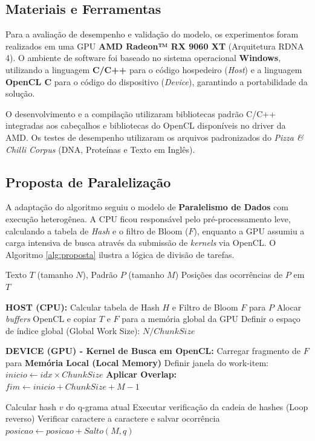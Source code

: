 \documentclass[12pt]{article}
\begin{document}
\subsection{Materiais e Ferramentas}

Para a avaliação de desempenho e validação do modelo, os experimentos foram realizados em uma GPU \textbf{AMD Radeon™ RX 9060 XT} (Arquitetura RDNA 4). O ambiente de software foi baseado no sistema operacional \textbf{Windows}, utilizando a linguagem \textbf{C/C++} para o código hospedeiro (\textit{Host}) e a linguagem \textbf{OpenCL C} para o código do dispositivo (\textit{Device}), garantindo a portabilidade da solução.

O desenvolvimento e a compilação utilizaram bibliotecas padrão C/C++ integradas aos cabeçalhos e bibliotecas do OpenCL disponíveis no driver da AMD. Os testes de desempenho utilizaram os arquivos padronizados do \textit{Pizza \& Chilli Corpus} (DNA, Proteínas e Texto em Inglês).

\subsection{Proposta de Paralelização}

A adaptação do algoritmo seguiu o modelo de \textbf{Paralelismo de Dados} com execução heterogênea. A CPU ficou responsável pelo pré-processamento leve, calculando a tabela de \textit{Hash} e o filtro de Bloom ($F$), enquanto a GPU assumiu a carga intensiva de busca através da submissão de \textit{kernels} via OpenCL. O Algoritmo \ref{alg:proposta} ilustra a lógica de divisão de tarefas.

\begin{algorithm}
\caption{Proposta de Paralelização do Hash Chain em OpenCL (CPU + GPU)}
\label{alg:proposta}
\begin{algorithmic}[1]
\Require Texto $T$ (tamanho $N$), Padrão $P$ (tamanho $M$)
\Ensure Posições das ocorrências de $P$ em $T$

\Statex \textbf{HOST (CPU):}
\State Calcular tabela de Hash $H$ e Filtro de Bloom $F$ para $P$
\State Alocar \textit{buffers} OpenCL e copiar $T$ e $F$ para a memória global da GPU
\State Definir o espaço de índice global (Global Work Size): $N / ChunkSize$

\Statex \textbf{DEVICE (GPU) - Kernel de Busca em OpenCL:}
    \State Carregar fragmento de $F$ para \textbf{Memória Local (Local Memory)}
    \State Definir janela do work-item: $inicio \leftarrow idx \times ChunkSize$
    \State \textbf{Aplicar Overlap:} $fim \leftarrow inicio + ChunkSize + M - 1$
    
        \State Calcular hash $v$ do q-grama atual
         
            \State Executar verificação da cadeia de hashes (Loop reverso)
                \State Verificar caractere a caractere e salvar ocorrência
            \EndIf
        \EndIf
        \State $posicao \leftarrow posicao + Salto(M, q)$
    \EndWhile
\EndFor
\end{algorithmic}
\end{algorithm}
\end{document}
